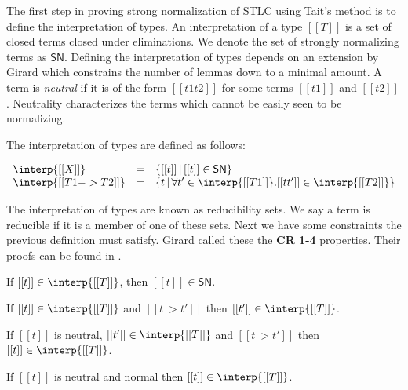 The first step in proving strong normalization of STLC using Tait's
method is to define the interpretation of types.  An interpretation of
a type $[[T]]$ is a set of closed terms closed under eliminations.  We
denote the set of strongly normalizing terms as $\mathsf{SN}$.
Defining the interpretation of types depends on an extension by Girard
which constrains the number of lemmas down to a minimal amount.  A
term is \emph{neutral} if it is of the form $[[t1 t2]]$ for some terms
$[[t1]]$ and $[[t2]]$.  Neutrality characterizes the terms which
cannot be easily seen to be normalizing.
\begin{definition}
  \label{def:stlc_interpretation_taits}
  The interpretation of types are defined as follows:
  \begin{center}
    \begin{math}
      \begin{array}{lll}
        \interp{[[X]]} & = & \{[[t]]\,|\, [[t]] \in \mathsf{SN} \}\\
        \interp{[[T1 -> T2]]} & = & \{ t\,|\,\forall t' \in \interp{[[T1]]}.
               [[t t']] \in \interp{[[T2]]} \}      
      \end{array}
    \end{math}
  \end{center}
\end{definition}
\noindent
The interpretation of types are known as reducibility sets.  We say a
term is reducible if it is a member of one of these sets.  Next we
have some constraints the previous definition must satisfy.  Girard
called these the \textbf{CR 1-4} properties.  Their proofs can be
found in \cite{Girard:1989}.
\vspace{-20px}
\begin{lemma}
  \label{lemma:stlc_sn_cr1}
  If $[[t]] \in \interp{[[T]]}$, then $[[t]] \in \mathsf{SN}$.
\end{lemma}

\begin{lemma}
  \label{lemma:stlc_sn_cr2}
  If $[[t]] \in \interp{[[T]]}$ and $[[t ~> t']]$ then $[[t']] \in \interp{[[T]]}$.
\end{lemma}

\begin{lemma}
  \label{lemma:stlc_sn_cr3}
  If $[[t]]$ is neutral, $[[t']] \in \interp{[[T]]}$ and $[[t ~> t']]$ then 
  $[[t]] \in \interp{[[T]]}$.
\end{lemma}

\begin{lemma}
  \label{lemma:stlc_sn_cr4}
  If $[[t]]$ is neutral and normal then $[[t]] \in \interp{[[T]]}$.
\end{lemma}

